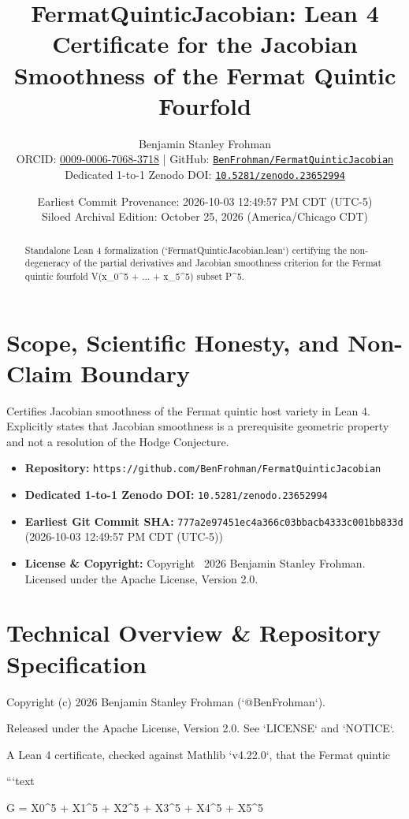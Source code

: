 \documentclass[11pt,a4paper]{article}
\title{\textbf{FermatQuinticJacobian: Lean 4 Certificate for the Jacobian Smoothness of the Fermat Quintic Fourfold}}
\author{Benjamin Stanley Frohman\\
\small ORCID: \href{https://orcid.org/0009-0006-7068-3718}{0009-0006-7068-3718} \quad|\quad
GitHub: \href{https://github.com/BenFrohman/FermatQuinticJacobian}{\texttt{BenFrohman/FermatQuinticJacobian}}\\
\small Dedicated 1-to-1 Zenodo DOI: \href{https://doi.org/10.5281/zenodo.23652994}{\texttt{10.5281/zenodo.23652994}}}
\date{Earliest Commit Provenance: 2026-10-03 12:49:57 PM CDT (UTC-5)\\
Siloed Archival Edition: October 25, 2026 (America/Chicago CDT)}
\begin{document}
\maketitle

\begin{abstract}
Standalone Lean 4 formalization (`FermatQuinticJacobian.lean`) certifying the non-degeneracy of the partial derivatives and Jacobian smoothness criterion for the Fermat quintic fourfold V(x\_0\textasciicircum{}5 + ... + x\_5\textasciicircum{}5) subset P\textasciicircum{}5.
\end{abstract}

\section{Scope, Scientific Honesty, and Non-Claim Boundary}
Certifies Jacobian smoothness of the Fermat quintic host variety in Lean 4. Explicitly states that Jacobian smoothness is a prerequisite geometric property and not a resolution of the Hodge Conjecture.

\begin{itemize}
  \item \textbf{Repository:} \texttt{https://github.com/BenFrohman/FermatQuinticJacobian}
  \item \textbf{Dedicated 1-to-1 Zenodo DOI:} \texttt{10.5281/zenodo.23652994}
  \item \textbf{Earliest Git Commit SHA:} \texttt{777a2e97451ec4a366c03bbacb4333c001bb833d} (2026-10-03 12:49:57 PM CDT (UTC-5))
  \item \textbf{License \& Copyright:} Copyright \textcopyright\ 2026 Benjamin Stanley Frohman. Licensed under the Apache License, Version 2.0.
\end{itemize}

\section{Technical Overview \& Repository Specification}
Copyright (c) 2026 Benjamin Stanley Frohman (`@BenFrohman`).

Released under the Apache License, Version 2.0. See `LICENSE` and `NOTICE`.

A Lean 4 certificate, checked against Mathlib `v4.22.0`, that the Fermat quintic

```text

G = X0\textasciicircum{}5 + X1\textasciicircum{}5 + X2\textasciicircum{}5 + X3\textasciicircum{}5 + X4\textasciicircum{}5 + X5\textasciicircum{}5
\end{document}

